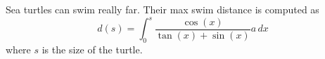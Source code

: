 Sea turtles can swim really far.
Their max swim distance is computed as
\begin{equation}
  d(s) = \int_0^s \frac{\cos(x)}{\tan(x) + \sin(x)}a \, dx \label{swim_distance} %
\end{equation}
where $s$ is the size of the turtle.
